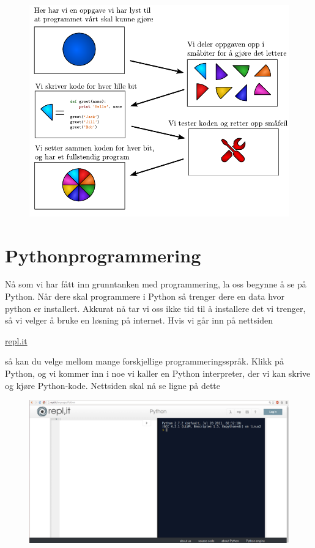 \documentclass[a4paper, 11pt, notitlepage]{article}
\begin{document}
\begin{figure}[!h]
\centering
\includegraphics{fig/programmering}
\end{figure}

\clearpage

\section*{Pythonprogrammering}

Nå som vi har fått inn grunntanken med programmering, la oss begynne å se på Python. Når dere skal programmere i Python så trenger dere en data hvor python er installert. Akkurat nå tar vi oss ikke tid til å installere det vi trenger, så vi velger å bruke en løsning på internet. Hvis vi går inn på nettsiden

\url{repl.it}

så kan du velge mellom mange forskjellige programmeringsspråk. Klikk på Python, og vi kommer inn i noe vi kaller en Python interpreter, der vi kan skrive og kjøre Python-kode. Nettsiden skal nå se ligne på dette
\begin{figure}[htpb]
	\centering
	\includegraphics[width=\textwidth]{fig/repl}
\end{figure}
\end{document}
